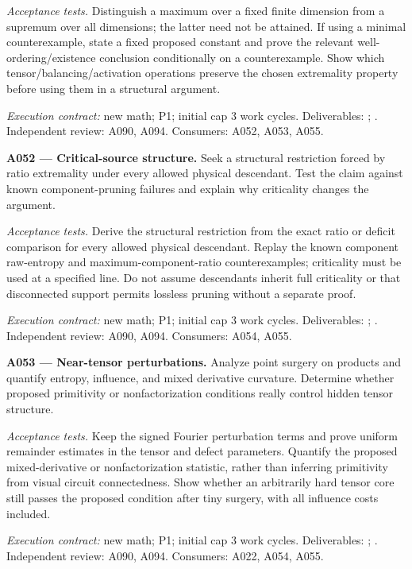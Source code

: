 \documentclass[11pt]{article}
\begin{document}
\emph{Acceptance tests.} Distinguish a maximum over a fixed finite dimension from a supremum over all dimensions; the latter need not be attained. If using a minimal counterexample, state a fixed proposed constant and prove the relevant well-ordering/existence conclusion conditionally on a counterexample. Show which tensor/balancing/activation operations preserve the chosen extremality property before using them in a structural argument.

{\small\emph{Execution contract:} new math; P1; initial cap 3 work cycles. Deliverables: ; . Independent review: A090, A094. Consumers: A052, A053, A055.}

\textbf{A052 --- Critical-source structure.} Seek a structural restriction forced by ratio extremality under every allowed physical descendant. Test the claim against known component-pruning failures and explain why criticality changes the argument.

\emph{Acceptance tests.} Derive the structural restriction from the exact ratio or deficit comparison for every allowed physical descendant. Replay the known component raw-entropy and maximum-component-ratio counterexamples; criticality must be used at a specified line. Do not assume descendants inherit full criticality or that disconnected support permits lossless pruning without a separate proof.

{\small\emph{Execution contract:} new math; P1; initial cap 3 work cycles. Deliverables: ; . Independent review: A090, A094. Consumers: A054, A055.}

\textbf{A053 --- Near-tensor perturbations.} Analyze point surgery on products and quantify entropy, influence, and mixed derivative curvature. Determine whether proposed primitivity or nonfactorization conditions really control hidden tensor structure.

\emph{Acceptance tests.} Keep the signed Fourier perturbation terms and prove uniform remainder estimates in the tensor and defect parameters. Quantify the proposed mixed-derivative or nonfactorization statistic, rather than inferring primitivity from visual circuit connectedness. Show whether an arbitrarily hard tensor core still passes the proposed condition after tiny surgery, with all influence costs included.

{\small\emph{Execution contract:} new math; P1; initial cap 3 work cycles. Deliverables: ; . Independent review: A090, A094. Consumers: A022, A054, A055.}
\end{document}
